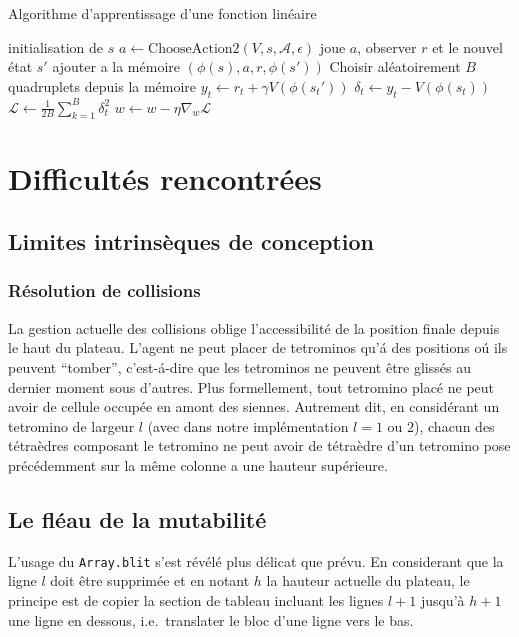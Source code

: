 \documentclass{report}
\begin{document}
\begin{algorithm}[H]
  \caption{Algorithme d'apprentissage d'une fonction linéaire}\label{alg:linfct}
  \begin{algorithmic}
    [1]
    \Repeat{}
    \State{} initialisation de \(s\)
    \Repeat{}
    \State{} \(a \gets \mathup{ChooseAction2}(V, s, \mathcal{A}, \epsilon)\)
    \State{} joue \(a\), observer \(r\) et le nouvel \'etat \(s'\)
    \State{} ajouter a la mémoire \( \left(\phi(s), a, r, \phi(s')\right) \)
    \EndFor{}
    \State{} Choisir aléatoirement \(B\) quadruplets depuis la mémoire
    \State{} \(y_t \gets r_t + \gamma V\left(\phi(s_t')\right)\)
    \State{} \(\delta_t \gets y_t - V \left(\phi(s_t)\right)\)
    \State{} \(\mathcal{L} \gets \frac{1}{2B}\sum_{k=1}^B \delta_t^2\)
    \State{} \(w \gets w - \eta \nabla_w \mathcal{L}\)
    \EndProcedure{}
  \end{algorithmic}
\end{algorithm}

\chapter{Difficultés rencontrées}

\section{Limites intrinsèques de conception}
\subsection{Résolution de collisions}
La gestion actuelle des collisions oblige l'accessibilité de la position finale
depuis le haut du plateau. L'agent ne peut placer de tetrominos qu'\'a des
positions o\'u ils peuvent ``tomber'', c'est-\'a-dire que les tetrominos ne
peuvent être glissés au dernier moment sous d'autres. Plus formellement, tout
tetromino placé ne peut avoir de cellule occupée en amont des siennes. Autrement
dit, en considérant un tetromino de largeur \(l\) (avec dans notre
implémentation \(l = 1\) ou \(2\)), chacun des tétraèdres composant le tetromino
ne peut avoir de tétraèdre d'un tetromino pose précédemment sur la même colonne
a une hauteur supérieure.

\section{Le fléau de la mutabilité}
L'usage du \texttt{Array.blit} s'est révélé plus délicat que prévu. En
considerant que la ligne \(l\) doit être supprimée et en notant \(h\) la hauteur
actuelle du plateau, le principe est de copier la section de tableau incluant
les lignes \(l+1\) jusqu'à \(h+1\) une ligne en dessous, i.e.\ translater le
bloc d'une ligne vers le bas.
\end{document}
